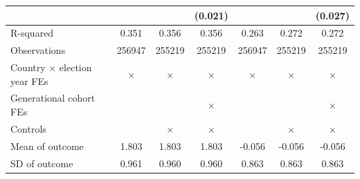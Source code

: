 {\begin{tabular}{l*{6}{c}}
                    &                     &                     &     (0.021)         &                     &                     &     (0.027)         \\
\midrule
R-squared           &       0.351         &       0.356         &       0.356         &       0.263         &       0.272         &       0.272         \\
Observations        &      256947         &      255219         &      255219         &      256947         &      255219         &      255219         \\
Country $\times$ election year FEs&    $\times$         &    $\times$         &    $\times$         &    $\times$         &    $\times$         &    $\times$         \\
Generational cohort FEs&                     &                     &    $\times$         &                     &                     &    $\times$         \\
Controls            &                     &    $\times$         &    $\times$         &                     &    $\times$         &    $\times$         \\
Mean of outcome     &       1.803         &       1.803         &       1.803         &      -0.056         &      -0.056         &      -0.056         \\
SD of outcome       &       0.961         &       0.960         &       0.960         &       0.863         &       0.863         &       0.863         \\
\bottomrule
\end{tabular}
}
